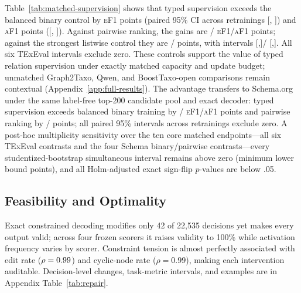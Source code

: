 \documentclass[11pt]{article}
\newcommand{\ef}{\textsc{eF1}}
\newcommand{\af}{\textsc{aF1}}
\begin{document}
Table~\ref{tab:matched-supervision} shows that typed supervision exceeds the
balanced binary control by
\MatchedObjectiveTexevalTypedMinusBinaryEdge{} \ef{} points (paired 95\% CI across retrainings
[\MatchedObjectiveTexevalTypedMinusBinaryEdgeLow, \MatchedObjectiveTexevalTypedMinusBinaryEdgeHigh]) and
\MatchedObjectiveTexevalTypedMinusBinaryAncestor{} \af{} points
([\MatchedObjectiveTexevalTypedMinusBinaryAncestorLow, \MatchedObjectiveTexevalTypedMinusBinaryAncestorHigh]).
Against pairwise ranking, the gains are
\MatchedObjectiveTexevalTypedMinusPairwiseEdge/\MatchedObjectiveTexevalTypedMinusPairwiseAncestor{}
\ef/\af{} points; against the strongest listwise control they are
\MatchedObjectiveTexevalTypedMinusListwiseEdge/\MatchedObjectiveTexevalTypedMinusListwiseAncestor{}
points, with intervals
[\MatchedObjectiveTexevalTypedMinusListwiseEdgeLow,\MatchedObjectiveTexevalTypedMinusListwiseEdgeHigh]/
[\MatchedObjectiveTexevalTypedMinusListwiseAncestorLow,\MatchedObjectiveTexevalTypedMinusListwiseAncestorHigh].
All six TExEval intervals exclude zero. These controls support the value of typed
relation supervision under exactly matched capacity and update budget; unmatched Graph2Taxo,
Qwen, and BoostTaxo-open comparisons remain contextual
(Appendix~\ref{app:full-results}).
The advantage transfers to Schema.org under the same label-free top-200
candidate pool and exact decoder: typed supervision exceeds balanced binary
training by \MatchedObjectiveSchemaTypedMinusBinaryEdge/\MatchedObjectiveSchemaTypedMinusBinaryAncestor{}
\ef/\af{} points and pairwise ranking by
\MatchedObjectiveSchemaTypedMinusPairwiseEdge/\MatchedObjectiveSchemaTypedMinusPairwiseAncestor{} points;
all paired 95\% intervals across retrainings exclude zero.
A post-hoc multiplicity sensitivity over the ten core
matched endpoints---all six TExEval contrasts and the four Schema binary/pairwise
contrasts---every studentized-bootstrap simultaneous interval remains above
zero (minimum lower bound \MatchedObjectiveMatchedCoreMinLower{} points), and all
Holm-adjusted exact sign-flip $p$-values are below .05.

\subsection{Feasibility and Optimality}

Exact constrained decoding modifies only 42 of 22,535 decisions yet makes every
output valid; across four frozen scorers it raises validity to 100\% while
activation frequency varies by scorer. Constraint tension is almost perfectly
associated with edit rate ($\rho=0.99$) and cyclic-node rate
($\rho=0.99$), making each intervention auditable. Decision-level changes,
task-metric intervals, and examples are in Appendix Table~\ref{tab:repair}.
\end{document}
